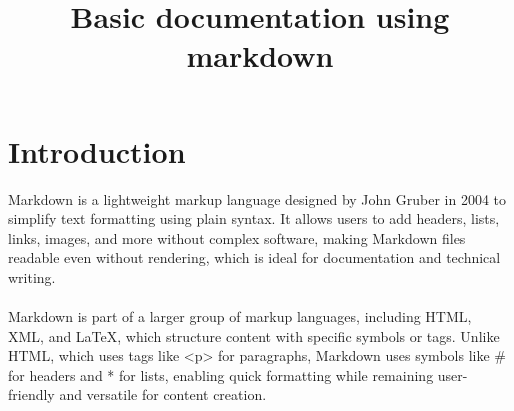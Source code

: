 \documentclass[12pt]{article}
\title{Basic documentation using markdown}
\author{}
\date{}
\begin{document}


\maketitle
\section*{Introduction}
Markdown is a lightweight markup language designed by John Gruber in 2004 to simplify text formatting using plain syntax. It allows users to add headers, lists, links, images, and more without complex software, making Markdown files readable even without rendering, which is ideal for documentation and technical writing.\\\\
Markdown is part of a larger group of markup languages, including HTML, XML, and LaTeX, which structure content with specific symbols or tags. Unlike HTML, which uses tags like <p> for paragraphs, Markdown uses symbols like \# for headers and * for lists, enabling quick formatting while remaining user-friendly and versatile for content creation.
\end{document}
